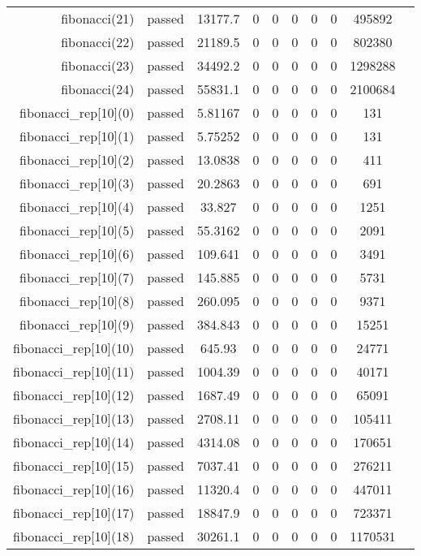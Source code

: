 \begin{longtable}{r|ccccccccc}
    fibonacci(21) & passed & 13177.7 & 0 & 0 & 0 & 0 & 0 & 495892 \\
    fibonacci(22) & passed & 21189.5 & 0 & 0 & 0 & 0 & 0 & 802380 \\
    fibonacci(23) & passed & 34492.2 & 0 & 0 & 0 & 0 & 0 & 1298288 \\
    fibonacci(24) & passed & 55831.1 & 0 & 0 & 0 & 0 & 0 & 2100684 \\
    fibonacci\_rep[10](0) & passed & 5.81167 & 0 & 0 & 0 & 0 & 0 & 131 \\
    fibonacci\_rep[10](1) & passed & 5.75252 & 0 & 0 & 0 & 0 & 0 & 131 \\
    fibonacci\_rep[10](2) & passed & 13.0838 & 0 & 0 & 0 & 0 & 0 & 411 \\
    fibonacci\_rep[10](3) & passed & 20.2863 & 0 & 0 & 0 & 0 & 0 & 691 \\
    fibonacci\_rep[10](4) & passed & 33.827 & 0 & 0 & 0 & 0 & 0 & 1251 \\
    fibonacci\_rep[10](5) & passed & 55.3162 & 0 & 0 & 0 & 0 & 0 & 2091 \\
    fibonacci\_rep[10](6) & passed & 109.641 & 0 & 0 & 0 & 0 & 0 & 3491 \\
    fibonacci\_rep[10](7) & passed & 145.885 & 0 & 0 & 0 & 0 & 0 & 5731 \\
    fibonacci\_rep[10](8) & passed & 260.095 & 0 & 0 & 0 & 0 & 0 & 9371 \\
    fibonacci\_rep[10](9) & passed & 384.843 & 0 & 0 & 0 & 0 & 0 & 15251 \\
    fibonacci\_rep[10](10) & passed & 645.93 & 0 & 0 & 0 & 0 & 0 & 24771 \\
    fibonacci\_rep[10](11) & passed & 1004.39 & 0 & 0 & 0 & 0 & 0 & 40171 \\
    fibonacci\_rep[10](12) & passed & 1687.49 & 0 & 0 & 0 & 0 & 0 & 65091 \\
    fibonacci\_rep[10](13) & passed & 2708.11 & 0 & 0 & 0 & 0 & 0 & 105411 \\
    fibonacci\_rep[10](14) & passed & 4314.08 & 0 & 0 & 0 & 0 & 0 & 170651 \\
    fibonacci\_rep[10](15) & passed & 7037.41 & 0 & 0 & 0 & 0 & 0 & 276211 \\
    fibonacci\_rep[10](16) & passed & 11320.4 & 0 & 0 & 0 & 0 & 0 & 447011 \\
    fibonacci\_rep[10](17) & passed & 18847.9 & 0 & 0 & 0 & 0 & 0 & 723371 \\
    fibonacci\_rep[10](18) & passed & 30261.1 & 0 & 0 & 0 & 0 & 0 & 1170531 \\

\end{longtable}
